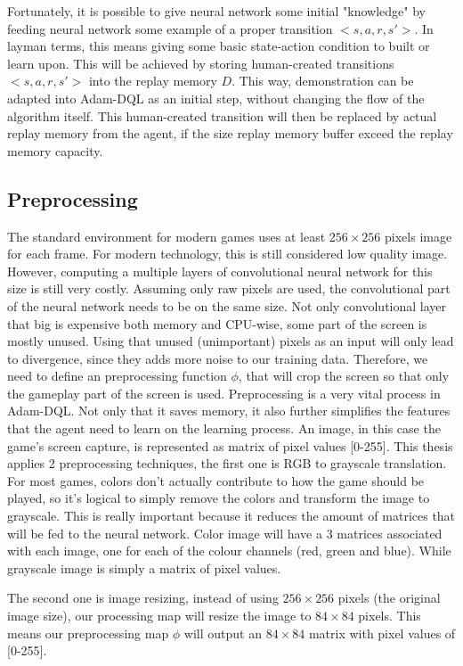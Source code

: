     \par
    Fortunately, it is possible to give neural network some initial "knowledge" \cite{DBLP:journals/corr/HesterVPLSPSDOA17} by feeding neural network some example of a proper transition $<s,a,r,s'>$. In layman terms, this means giving some basic state-action condition to built or learn upon. This will be achieved by storing human-created transitions $<s,a,r,s'>$ into the  replay memory $D$. This way, demonstration can be adapted into Adam-DQL as an initial step, without changing the flow of the algorithm itself. This human-created transition will then be replaced by actual replay memory from the agent, if the size replay memory buffer exceed the replay memory capacity.  
    
    \subsection{Preprocessing}
    \label{sec:preprocessing}
        The standard environment for modern games uses at least $256 \times 256$ pixels image for each frame. For modern technology, this is still considered low quality image. However, computing a multiple layers of convolutional neural network for this size is still very costly. Assuming only raw pixels are used, the convolutional part of the neural network needs to be on the same size. Not only convolutional layer that big is expensive both memory and CPU-wise, some part of the screen is mostly unused. Using that unused (unimportant) pixels as an input will only lead to divergence, since they adds more noise to our training data. Therefore, we need to define an preprocessing function $\phi$, that will crop the screen so that only the gameplay part of the screen is used. Preprocessing is a very vital process in Adam-DQL. Not only that it saves memory, it also further simplifies the features that the agent need to learn on the learning process. An image, in this case the game's screen capture, is represented as matrix of pixel values [0-255]. This thesis applies 2 preprocessing techniques, the first one is RGB to grayscale translation. For most games, colors don't actually contribute to how the game should be played, so it's logical to simply remove the colors and transform the image to grayscale. This is really important because it reduces the amount of matrices that will be fed to the neural network. Color image will have a 3 matrices associated with each image, one for each of the colour channels (red, green and blue). While grayscale image is simply a matrix of pixel values.
    \par
    The second one is image resizing, instead of using $256 \times 256$ pixels (the original image size), our processing map will resize the image to $84 \times 84$ pixels. This means our preprocessing map $\phi$ will output an $84 \times 84$ matrix with pixel values of [0-255]. 
    
